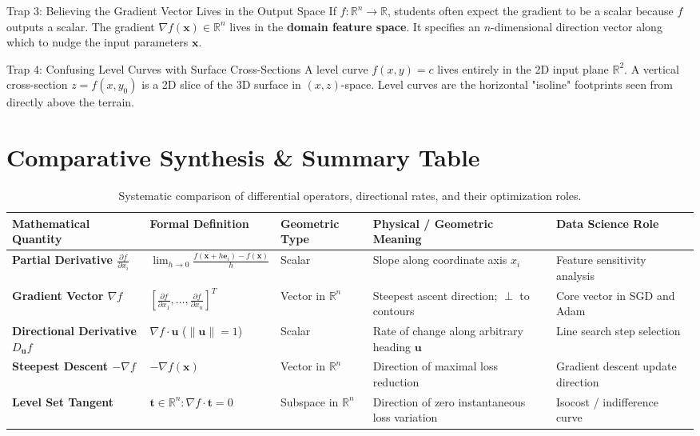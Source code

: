 \begin{trapbox}{Trap 3: Believing the Gradient Vector Lives in the Output Space}
If $f: \mathbb{R}^n \to \mathbb{R}$, students often expect the gradient to be a scalar because $f$ outputs a scalar. The gradient $\nabla f(\mathbf{x}) \in \mathbb{R}^n$ lives in the \textbf{domain feature space}. It specifies an $n$-dimensional direction vector along which to nudge the input parameters $\mathbf{x}$.
\end{trapbox}

\begin{trapbox}{Trap 4: Confusing Level Curves with Surface Cross-Sections}
A level curve $f(x, y) = c$ lives entirely in the 2D input plane $\mathbb{R}^2$. A vertical cross-section $z = f(x, y_0)$ is a 2D slice of the 3D surface in $(x, z)$-space. Level curves are the horizontal "isoline" footprints seen from directly above the terrain.
\end{trapbox}

\section{Comparative Synthesis \& Summary Table}

\begin{table}[htbp]
\centering
\small
\begin{tabular}{p{2.8cm} p{2.6cm} p{2.2cm} p{3.2cm} p{2.8cm}}
\toprule
\textbf{Mathematical Quantity} & \textbf{Formal Definition} & \textbf{Geometric Type} & \textbf{Physical / Geometric Meaning} & \textbf{Data Science Role} \\
\midrule
\textbf{Partial Derivative $\frac{\partial f}{\partial x_i}$} & $\lim_{h \to 0} \frac{f(\mathbf{x} + h\mathbf{e}_i) - f(\mathbf{x})}{h}$ & Scalar & Slope along coordinate axis $x_i$ & Feature sensitivity analysis \\
\textbf{Gradient Vector $\nabla f$} & $\left[ \frac{\partial f}{\partial x_1}, \dots, \frac{\partial f}{\partial x_n} \right]^T$ & Vector in $\mathbb{R}^n$ & Steepest ascent direction; $\perp$ to contours & Core vector in SGD and Adam \\
\textbf{Directional Derivative $D_{\mathbf{u}} f$} & $\nabla f \cdot \mathbf{u}$ ($\|\mathbf{u}\| = 1$) & Scalar & Rate of change along arbitrary heading $\mathbf{u}$ & Line search step selection \\
\textbf{Steepest Descent $-\nabla f$} & $-\nabla f(\mathbf{x})$ & Vector in $\mathbb{R}^n$ & Direction of maximal loss reduction & Gradient descent update direction \\
\textbf{Level Set Tangent} & $\mathbf{t} \in \mathbb{R}^n: \nabla f \cdot \mathbf{t} = 0$ & Subspace in $\mathbb{R}^n$ & Direction of zero instantaneous loss variation & Isocost / indifference curve \\
\bottomrule
\end{tabular}
\caption{Systematic comparison of differential operators, directional rates, and their optimization roles.}
\label{tab:multivariable_derivatives_comparison}
\end{table}

